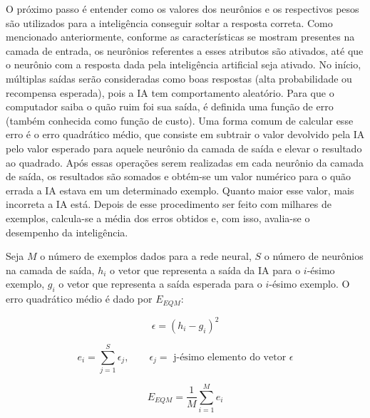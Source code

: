 O próximo passo é entender como os valores dos neurônios e os respectivos pesos são utilizados para a inteligência conseguir soltar a resposta correta.
Como mencionado anteriormente, conforme as características se mostram presentes na camada de entrada, os neurônios referentes a esses atributos são ativados, até que o neurônio com a resposta dada pela inteligência artificial seja ativado.
No início, múltiplas saídas serão consideradas como boas respostas (alta probabilidade ou recompensa esperada), pois a IA tem comportamento aleatório.
Para que o computador saiba o quão ruim foi sua saída, é definida uma função de erro (também conhecida como função de custo). Uma forma comum de calcular esse erro é o erro quadrático médio, que consiste em subtrair o valor devolvido pela IA pelo valor esperado para aquele neurônio da camada de saída e elevar o resultado ao quadrado. Após essas operações serem realizadas em cada neurônio da camada de saída, os resultados são somados e obtém-se um valor numérico para o quão errada a IA estava em um determinado exemplo. Quanto maior esse valor, mais incorreta a IA está. Depois de esse procedimento ser feito com milhares de exemplos, calcula-se a média dos erros obtidos e, com isso, avalia-se o desempenho da inteligência.

Seja $M$ o número de exemplos dados para a rede neural, $S$ o número de neurônios na camada de saída, $h_{i}$ o vetor que representa a saída da IA para o $i$-ésimo exemplo, $g_{i}$ o vetor que representa a saída esperada para o $i$-ésimo exemplo. O erro quadrático médio é dado por $E_{EQM}$:

\begin{equation} \label{eq:sme01}
\epsilon = (h_{i} - g_{i})^{2}
\end{equation}

\begin{equation} \label{eq:sme02}
e_{i} = \sum_{j=1}^{S}\epsilon_{j}, \qquad \epsilon_{j} = \text{ j-ésimo elemento do vetor }\epsilon
\end{equation}

\begin{equation} \label{eq:sme03}
E_{EQM} = \frac{1}{M} \sum_{i=1}^{M}e_{i}
\end{equation}

